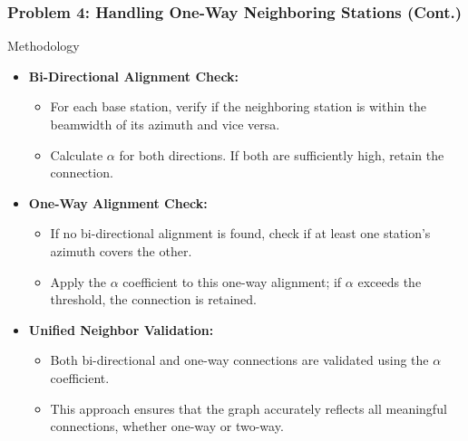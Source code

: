 \begin{frame}
    \frametitle{Problem 4: Handling One-Way Neighboring Stations (Cont.)}

    \begin{block}{Methodology}
        \begin{itemize}
            \item \textbf{Bi-Directional Alignment Check:}
            \begin{itemize}
                \item For each base station, verify if the neighboring station is within the beamwidth of its azimuth and vice versa.
                \item Calculate \( \alpha \) for both directions. If both are sufficiently high, retain the connection.
            \end{itemize}
            \item \textbf{One-Way Alignment Check:}
            \begin{itemize}
                \item If no bi-directional alignment is found, check if at least one station's azimuth covers the other.
                \item Apply the \( \alpha \) coefficient to this one-way alignment; if \( \alpha \) exceeds the threshold, the connection is retained.
            \end{itemize}
            \item \textbf{Unified Neighbor Validation:}
            \begin{itemize}
                \item Both bi-directional and one-way connections are validated using the \( \alpha \) coefficient.
                \item This approach ensures that the graph accurately reflects all meaningful connections, whether one-way or two-way.
            \end{itemize}
        \end{itemize}
    \end{block}
\end{frame}


